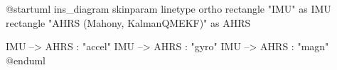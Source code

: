 \documentclass[11pt]{article}
\begin{document}
\begin{plantuml}
@startuml ins_diagram
skinparam linetype ortho
rectangle "IMU" as IMU
rectangle "AHRS (Mahony, KalmanQMEKF)" as AHRS

IMU --> AHRS : "accel"
IMU --> AHRS : "gyro"
IMU --> AHRS : "magn"
@enduml
\end{plantuml}
\end{document}
